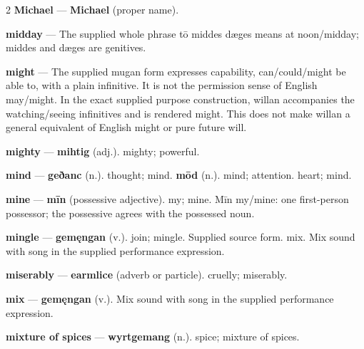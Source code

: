 \begin{multicols}{2}
\textbf{Michael} — \textbf{Michael} (proper name).\par
\textbf{midday} — The supplied whole phrase tō middes dæges means at noon/midday; middes and dæges are genitives.\par
\textbf{might} — The supplied mugan form expresses capability, can/could/might be able to, with a plain infinitive. It is not the permission sense of English may/might. In the exact supplied purpose construction, willan accompanies the watching/seeing infinitives and is rendered might. This does not make willan a general equivalent of English might or pure future will.\par
\textbf{mighty} — \textbf{mihtig} (adj.). mighty; powerful.\par
\textbf{mind} — \textbf{geðanc} (n.). thought; mind. \textbf{mōd} (n.). mind; attention. heart; mind.\par
\textbf{mine} — \textbf{mīn} (possessive adjective). my; mine. Mīn my/mine: one first-person possessor; the possessive agrees with the possessed noun.\par
\textbf{mingle} — \textbf{gemęngan} (v.). join; mingle. Supplied source form. mix. Mix sound with song in the supplied performance expression.\par
\textbf{miserably} — \textbf{earmlice} (adverb or particle). cruelly; miserably.\par
\textbf{mix} — \textbf{gemęngan} (v.). Mix sound with song in the supplied performance expression.\par
\textbf{mixture of spices} — \textbf{wyrtgemang} (n.). spice; mixture of spices.\par

\end{multicols}
